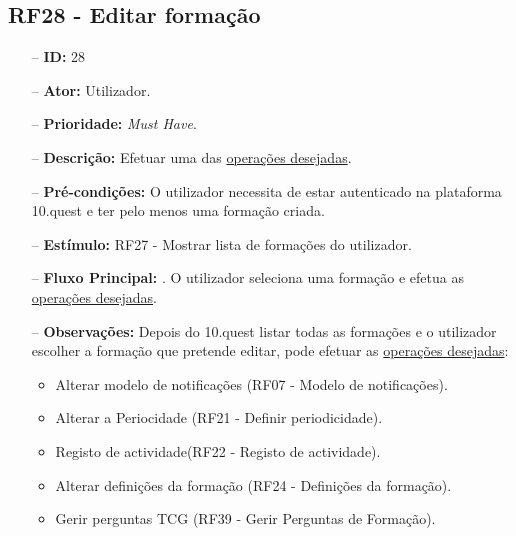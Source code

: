 \subsection{RF28 - Editar formação}
\begin{itemize}
	\item[--] \textbf{ID:} 28
	\item[--]  \textbf{Ator:} Utilizador.
	\item[--]  \textbf{Prioridade:} \textit{Must Have}.
	\item[--]  \textbf{Descrição:} Efetuar uma das \underline{operações desejadas}.
	\item[--]  \textbf{Pré-condições:} O utilizador necessita de estar autenticado na plataforma 10.quest e ter pelo menos uma formação criada.
	\item[--]  \textbf{Estímulo:} RF27 - Mostrar lista de formações do utilizador.
	\item[--]  \textbf{Fluxo Principal:} 
		. O utilizador seleciona uma formação e efetua as \underline{operações desejadas}.
	\begin{comment}
	\item[--]  \textbf{Fluxo de Excepção:} 
		\subitem 1a. O 10.quest não consegue efetuar o pedido à API do TCG devido a uma falha na conexão.
		\subitem 1a1. O 10.quest notifica o utilizador que ocorreu uma falha na conexão.
		\subitem 1b. O serviço do TCG (API) está indisponível.
		\subitem 1b1. O 10.quest notifica o utilizador que o serviço do TCG está temporariamente indisponível.
	\end{comment} 
	\item[--]  \textbf{Observações:} Depois do 10.quest listar todas as formações e o utilizador escolher a formação que pretende editar, pode efetuar as \underline{operações desejadas}:
	\begin{itemize}
		\item Alterar modelo de notificações (RF07 - Modelo de notificações).
		\item Alterar a Periocidade (RF21 - Definir periodicidade).
		\item Registo de actividade(RF22 - Registo de actividade).
		\item Alterar definições da formação (RF24 - Definições da formação).
		\item Gerir perguntas TCG (RF39 - Gerir Perguntas de Formação).
	\end{itemize}
\end{itemize}
\newpage

